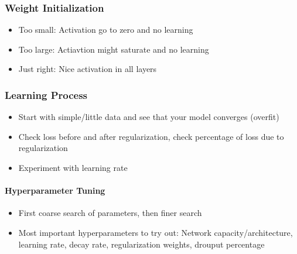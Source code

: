 \begin{multicols}{2}
    \subsubsection{Weight Initialization}
    \begin{itemize}
        \item Too small: Activation go to zero and no learning
        \item Too large: Actiavtion might saturate and no learning
        \item Just right: Nice activation in all layers
    \end{itemize}

    \subsubsection{Learning Process}
    \begin{itemize}
        \item Start with simple/little data and see that your model converges (overfit)
        \item Check loss before and after regularization, check percentage of loss due to regularization
        \item Experiment with learning rate
    \end{itemize}

    \paragraph{Hyperparameter Tuning}
    \begin{itemize}
        \item First coarse search of parameters, then finer search
        \item Most important hyperparameters to try out: Network capacity/architecture, learning rate, decay rate, regularization weights, drouput percentage
    \end{itemize}
\end{multicols}

